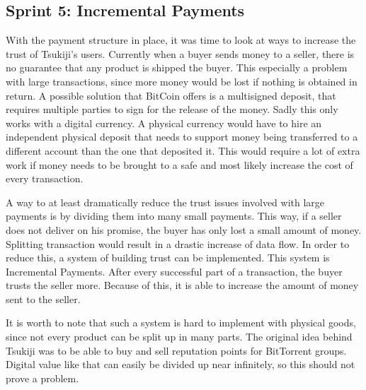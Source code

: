 \subsection{Sprint 5: Incremental Payments}
With the payment structure in place, it was time to look at ways to increase the trust of Tsukiji's users.
Currently when a buyer sends money to a seller, there is no guarantee that any product is shipped the buyer.
This especially a problem with large transactions, since more money would be lost if nothing is obtained in return.
A possible solution that BitCoin offers is a multisigned deposit, that requires multiple parties to sign for the release of the money.
Sadly this only works with a digital currency.
A physical currency would have to hire an independent physical deposit that needs to support money being transferred to a different account than the one that deposited it.
This would require a lot of extra work if money needs to be brought to a safe and most likely increase the cost of every transaction.

A way to at least dramatically reduce the trust issues involved with large payments is by dividing them into many small payments.
This way, if a seller does not deliver on his promise, the buyer has only lost a small amount of money.
Splitting transaction would result in a drastic increase of data flow. 
In order to reduce this, a system of building trust can be implemented.
This system is Incremental Payments.
After every successful part of a transaction, the buyer trusts the seller more.
Because of this, it is able to increase the amount of money sent to the seller.

It is worth to note that such a system is hard to implement with physical goods, since not every product can be split up in many parts.
The original idea behind Tsukiji was to be able to buy and sell reputation points for BitTorrent groups. Digital value like that can easily be divided up near infinitely, so this should not prove a problem.
